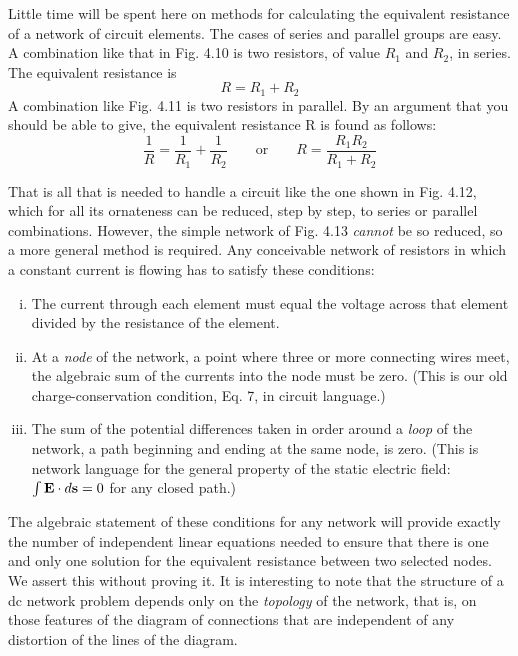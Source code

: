 Little time will be spent here on methods for calculating the
equivalent resistance of a network of circuit elements. The cases of
series and parallel groups are easy. A combination like that in
Fig. 4.10 is two resistors, of value $R_1$ and $R_2$, in series. The equivalent
resistance is
\begin{equation}
  R = R_1 + R_2
\end{equation}
A combination like Fig. 4.11 is two resistors in parallel. By an argument
that you should be able to give, the equivalent resistance R is
found as follows:
\begin{equation}
  \frac{1}{R} = \frac{1}{R_1} + \frac{1}{R_2} \qquad \text{or} \qquad
  R = \frac{R_1R_2}{R_1+R_2}
\end{equation}

That is all that is needed to handle a circuit like the one shown in
Fig. 4.12, which for all its ornateness can be reduced, step by step,
to series or parallel combinations. However, the simple network of
Fig. 4.13 \emph{cannot} be so reduced, so a more general method is required.
Any conceivable network of resistors in which a constant current is
flowing has to satisfy these conditions:

\begin{enumerate}[(i)]
\item The current through each element must equal the voltage
across that element divided by the resistance of the
element.

\item At a \emph{node} of the network, a point where three or more connecting
wires meet, the algebraic sum of the currents into
the node must be zero. (This is our old charge-conservation condition, Eq. 7, in circuit language.)

\item The sum of the potential differences taken in order around
a \emph{loop} of the network, a path beginning and ending at the
same node, is zero. (This is network language for the
general property of the static electric field: $\int\mathbf{E}\cdot d\mathbf{s}=0$ for
any closed path.)
\end{enumerate}

The algebraic statement of these conditions for any network will
provide exactly the number of independent linear equations needed
to ensure that there is one and only one solution for the equivalent
resistance between two selected nodes. We assert this without proving
it. It is interesting to note that the structure of a dc network
problem depends only on the \emph{topology} of the network, that is, on
those features of the diagram of connections that are independent
of any distortion of the lines of the diagram.

